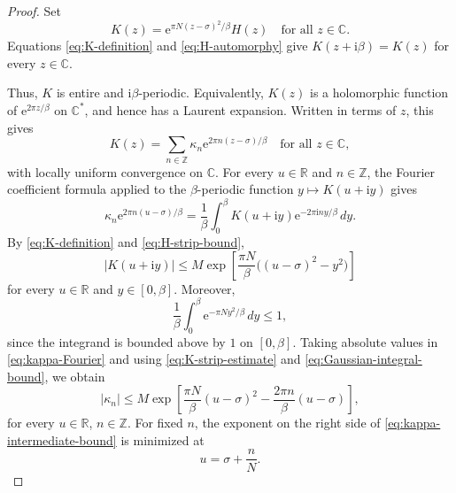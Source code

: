 \documentclass[11pt]{amsart}
\numberwithin{equation}{section}
\theoremstyle{definition}
\theoremstyle{remark}
\newcommand{\R}{\mathbb R}
\newcommand{\C}{\mathbb C}
\newcommand{\Z}{\mathbb Z}
\newcommand{\ii}{\mathrm i}
\newcommand{\e}{\mathrm e}
\begin{document}
\begin{proof}
    Set
    \begin{equation}\label{eq:K-definition}
        K(z)=\e^{\pi N(z-\sigma)^2/\beta}H(z) \quad\text{for all }z\in\C.
    \end{equation}
    Equations \eqref{eq:K-definition} and \eqref{eq:H-automorphy} give $K(z+\ii\beta)=K(z)$ for every $z\in\C$.

    Thus, $K$ is entire and $\ii\beta$-periodic. Equivalently, $K(z)$ is a holomorphic function of $\e^{2\pi z/\beta}$ on $\C^\ast$, and hence has a Laurent expansion. Written in terms of $z$, this gives
    \begin{equation}\label{eq:K-Fourier}
        K(z)=\sum_{n\in\Z} \kappa_n\e^{2\pi n(z-\sigma)/\beta} \quad\text{for all }z\in\C,
    \end{equation}
    with locally uniform convergence on $\C$. For every $u\in\R$ and $n\in\Z$, the Fourier coefficient formula applied to the $\beta$-periodic function $y\mapsto K(u+\ii y)$ gives
    \begin{equation}\label{eq:kappa-Fourier}
        \kappa_n\e^{2\pi n(u-\sigma)/\beta} = \frac1\beta\int_0^\beta K(u+\ii y)\e^{-2\pi\ii ny/\beta}\,dy. 
    \end{equation}
    By \eqref{eq:K-definition} and \eqref{eq:H-strip-bound},
    \begin{equation}\label{eq:K-strip-estimate}
        |K(u+\ii y)| \leq M\exp\left[ \frac{\pi N}{\beta} \bigl((u-\sigma)^2-y^2\bigr) \right] 
    \end{equation}
    for every $u\in\R$ and $y\in[0,\beta]$. Moreover,
    \begin{equation}\label{eq:Gaussian-integral-bound}
        \frac1\beta\int_0^\beta \e^{-\pi Ny^2/\beta}\,dy \leq 1,
    \end{equation}
    since the integrand is bounded above by $1$ on $[0,\beta]$. Taking absolute values in \eqref{eq:kappa-Fourier} and using \eqref{eq:K-strip-estimate} and \eqref{eq:Gaussian-integral-bound}, we obtain
    \begin{equation}\label{eq:kappa-intermediate-bound}
        |\kappa_n| \leq M\exp\left[ \frac{\pi N}{\beta}(u-\sigma)^2 -\frac{2\pi n}{\beta}(u-\sigma) \right],
    \end{equation}
    for every $u\in\R$, $n\in\Z$. For fixed $n$, the exponent on the right side of \eqref{eq:kappa-intermediate-bound} is minimized at 
    \begin{equation}
        u=\sigma+\frac{n}{N}. 
    \end{equation} 

\end{proof}
\end{document}
